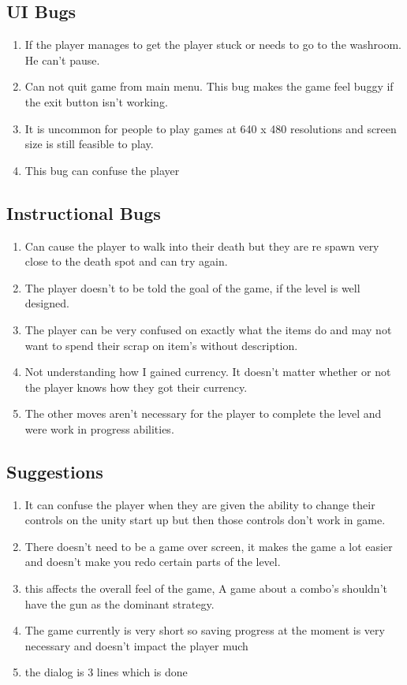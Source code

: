 \documentclass{article}
\begin{document}
\subsection*{UI Bugs}
\begin{enumerate}
	\item If the player manages to get the player stuck or needs to go to the washroom. He can't pause.
	\item Can not quit game from main menu. This bug makes the game feel buggy if the exit button isn't working.
	\item It is uncommon for people to play games at 640 x 480 resolutions and screen size is still feasible to play.
	\item This bug can confuse the player
\end{enumerate}
\subsection*{Instructional Bugs}
\begin{enumerate}
	\item Can cause the player to walk into their death but they are re spawn very close to the death spot and can try again. 
	\item The player doesn't to be told the goal of the game, if the level is well designed.
	\item  The player can be very confused on exactly what the items do and may not want to spend their scrap on item's without description.
	\item Not understanding how I gained currency. It doesn't matter whether or not the player knows how they got their currency. 
	\item The other moves aren't necessary for the player to complete the level and were work in progress abilities. 
\end{enumerate}
\subsection*{Suggestions}
\begin{enumerate}
	\item  It can confuse the player when they are given the ability to change their controls on the unity start up but then those controls don't work in game. 
	\item There doesn't need to be a game over screen, it makes the game a lot easier and doesn't make you redo certain parts of the level.
	\item this affects the overall feel of the game, A game about a combo's shouldn't have the gun as the dominant strategy.
	\item The game currently is very short so saving progress at the moment is very necessary and doesn't impact the player much 
	\item the dialog is 3 lines which is done
\end{enumerate} 
\end{document}
